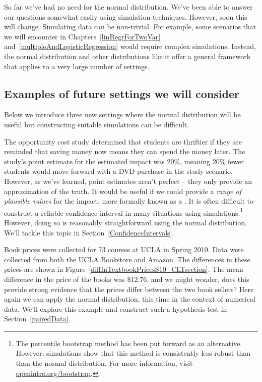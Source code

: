So far we've had no need for the normal distribution. We've been able to answer our questions somewhat easily using simulation techniques. However, soon this will change. Simulating data can be non-trivial. For example, some scenarios that we will encounter in Chapters~\ref{linRegrForTwoVar} and~\ref{multipleAndLogisticRegression} would require complex simulations. Instead, the normal distribution and other distributions like it offer a general framework that applies to a very large number of settings.


\subsection{Examples of future settings we will consider}

Below we introduce three new settings where the normal distribution will be useful but constructing suitable simulations can be difficult.

\begin{example}{The opportunity cost study determined that students are thriftier if they are reminded that saving money now means they can spend the money later. The study's point estimate for the estimated impact was 20\%, meaning 20\% fewer students would move forward with a DVD purchase in the study scenario. However, as we've learned, point estimates aren't perfect -- they only provide an approximation of the truth.}
It would be useful if we could provide a \emph{range of plausible values} for the impact, more formally known as a . It is often difficult to construct a reliable confidence interval in many situations using simulations.\footnote{The percentile bootstrap method has been put forward as an alternative. However, simulations show that this method is consistently less robust than than the normal distribution. For more information, visit \href{http://openintro.org/bootstrap}{openintro.org/bootstrap}.} However, doing so is reasonably straightforward using the normal distribution. We'll tackle this topic in Section~\ref{ConfidenceIntervals}.
\end{example}

\begin{example}{Book prices were collected for 73 courses at UCLA in Spring 2010. Data were collected from both the UCLA Bookstore and Amazon. The differences in these prices are shown in Figure~\ref{diffInTextbookPricesS10_CLTsection}. The mean difference in the price of the books was \$12.76, and we might wonder, does this provide strong evidence that the prices differ between the two book sellers?}
Here again we can apply the normal distribution, this time in the context of numerical data. We'll explore this example and construct such a hypothesis test in Section~\ref{pairedData}.
\end{example}

